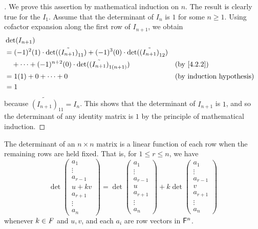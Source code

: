 \begin{proof}[]
	We prove this assertion by mathematical induction on \(n\).
	The result is clearly true for the \(I_1\).
	Assume that the determinant of \(I_n\) is \(1\) for some \(n \geq 1\).
	Using cofactor expansion along the first row of \(I_{n + 1}\), we obtain
	\begin{align*}
		 & \det(I_{n + 1})                                                                                                                             \\
		 & = (-1)^2 (1) \cdot \det(\tilde{(I_{n + 1})}_{1 1}) + (-1)^3 (0) \cdot \det(\tilde{(I_{n + 1})}_{1 2})                                       \\
		 & \quad + \cdots  + (-1)^{n + 2} (0) \cdot \det(\tilde{(I_{n + 1})}_{1 (n + 1)})                        &  & \by{4.2.2}                       \\
		 & = 1(1) + 0 + \cdots + 0                                                                               &  & \text{(by induction hypothesis)} \\
		 & = 1
	\end{align*}
	because \(\tilde{(I_{n + 1})}_{1 1} = I_n\).
	This shows that the determinant of \(I_{n + 1}\) is \(1\), and so the determinant of any identity matrix is \(1\) by the principle of mathematical induction.
\end{proof}

\begin{thm}\label{4.3}
	The determinant of an \(n \times n\) matrix is a linear function of each row when the remaining rows are held fixed.
	That is, for \(1 \leq r \leq n\), we have
	\[
		\det\begin{pmatrix}
			a_1       \\
			\vdots    \\
			a_{r - 1} \\
			u + kv    \\
			a_{r + 1} \\
			\vdots    \\
			a_n
		\end{pmatrix} = \det\begin{pmatrix}
			a_1       \\
			\vdots    \\
			a_{r - 1} \\
			u         \\
			a_{r + 1} \\
			\vdots    \\
			a_n
		\end{pmatrix} + k \det\begin{pmatrix}
			a_1       \\
			\vdots    \\
			a_{r - 1} \\
			v         \\
			a_{r + 1} \\
			\vdots    \\
			a_n
		\end{pmatrix}
	\]
	whenever \(k \in \mathit{F}\) and \(u, v\), and each \(a_i\) are row vectors in \(\mathsf{F}^n\).
\end{thm}

